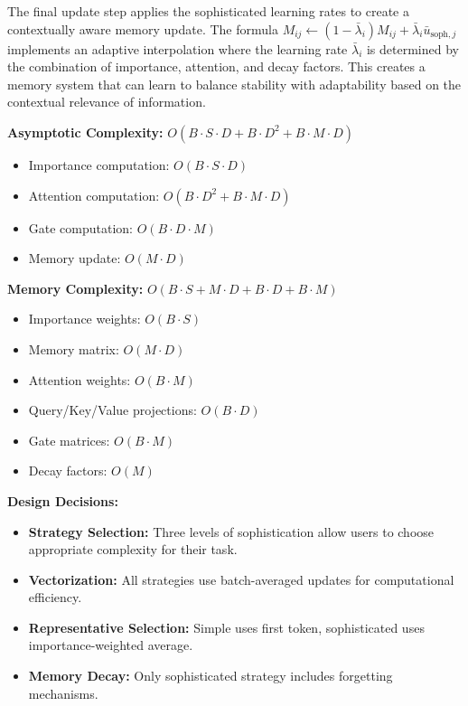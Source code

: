 \documentclass{article}
\begin{document}
\begin{enumerate}
The final update step applies the sophisticated learning rates to create a contextually aware memory update. The formula $M_{ij} \leftarrow (1 - \bar{\lambda}_i) M_{ij} + \bar{\lambda}_i \bar{u}_{\text{soph},j}$ implements an adaptive interpolation where the learning rate $\bar{\lambda}_i$ is determined by the combination of importance, attention, and decay factors. This creates a memory system that can learn to balance stability with adaptability based on the contextual relevance of information.

\textbf{Asymptotic Complexity:} $O(B \cdot S \cdot D + B \cdot D^2 + B \cdot M \cdot D)$
\begin{itemize}
\item Importance computation: $O(B \cdot S \cdot D)$
\item Attention computation: $O(B \cdot D^2 + B \cdot M \cdot D)$
\item Gate computation: $O(B \cdot D \cdot M)$
\item Memory update: $O(M \cdot D)$
\end{itemize}

\textbf{Memory Complexity:} $O(B \cdot S + M \cdot D + B \cdot D + B \cdot M)$
\begin{itemize}
\item Importance weights: $O(B \cdot S)$
\item Memory matrix: $O(M \cdot D)$
\item Attention weights: $O(B \cdot M)$
\item Query/Key/Value projections: $O(B \cdot D)$
\item Gate matrices: $O(B \cdot M)$
\item Decay factors: $O(M)$
\end{itemize}
\end{enumerate}

\textbf{Design Decisions:} 
\begin{itemize}
\item \textbf{Strategy Selection:} Three levels of sophistication allow users to choose appropriate complexity for their task.
\item \textbf{Vectorization:} All strategies use batch-averaged updates for computational efficiency.
\item \textbf{Representative Selection:} Simple uses first token, sophisticated uses importance-weighted average.
\item \textbf{Memory Decay:} Only sophisticated strategy includes forgetting mechanisms.
\end{itemize}
\end{document}
